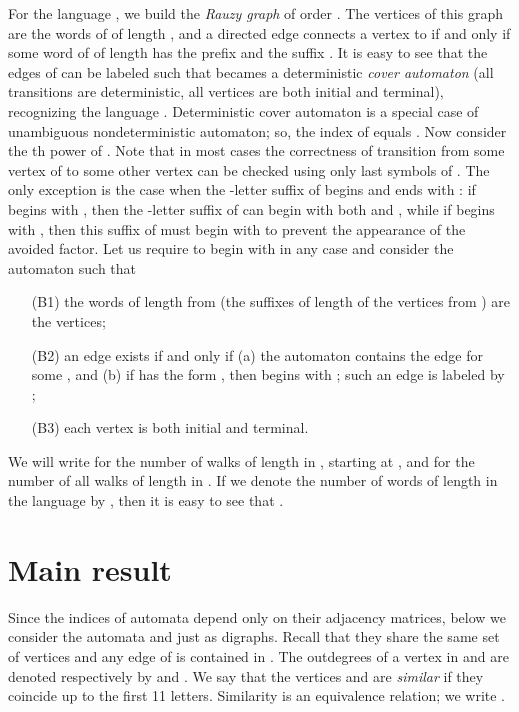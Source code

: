 \documentclass[submission,copyright]{eptcs}\providecommand{\event}{WORDS 2011}
\begin{document}
\smallskip
For the language , we build the \textit{Rauzy graph}  of order . The vertices of this graph are the words of  of length , and a directed edge connects a vertex  to  if and only if some word of  of length  has the prefix  and the suffix . It is easy to see that the edges of  can be labeled such that  becames a deterministic \textit{cover automaton} (all transitions are deterministic, all vertices are both initial and terminal), recognizing the language . Deterministic cover automaton is a special case of unambiguous nondeterministic automaton; so, the index of  equals . Now consider the th power  of . Note that in most cases the correctness of transition from some vertex  of  to some other vertex  can be checked using only  last symbols of . The only exception is the case when the -letter suffix of  begins and ends with : if  begins with , then the -letter suffix of  can begin with both  and , while if  begins with , then this suffix of  must begin with  to prevent the appearance of the avoided  factor. Let us require  to begin with  in any case and consider the automaton  such that 
\begin{enumerate}
\item[(B1)] the words of length  from  (the suffixes of length  of the vertices from ) are the vertices; 
\item[(B2)] an edge  exists if and only if (a) the automaton  contains the edge  for some , and (b) if  has the form , then  begins with ; such an edge is labeled by ;
\item[(B3)] each vertex is both initial and terminal.
\end{enumerate}

We will write  for the number of walks of length  in , starting at , and  for the number of all walks of length  in . If we denote the number of words of length  in the language  by , then it is easy to see that .


\section {Main result}

Since the indices of automata depend only on their adjacency matrices, below we consider the automata  and  just as digraphs. Recall that they share the same set of vertices and any edge of  is contained in . The outdegrees of a vertex  in  and  are denoted respectively by  and . We say that the vertices  and  are \textit{similar} if they coincide up to the first 11 letters. Similarity is an equivalence relation; we write . 
\end{document}
